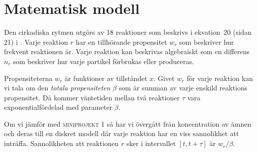 \section{Matematisk modell}
\label{sec:modell}

Den cirkadiska rytmen utgörs av 18 reaktioner som beskrivs i ekvation~20 (sidan 21) i \cite{hellander}. Varje reaktion $r$ har en tillhörande propensitet $w_r$ som beskriver hur frekvent reaktionen är. Varje reaktion kan beskrivas algebraiskt som en differens $n_r$ som beskriver hur varje partikel förbrukas eller produceras.

Propensiteterna $w_r$ är funktioner av tillståndet $x$. Givet $w_r$ för varje reaktion kan vi tala om den \emph{totala propensiteten} $\beta$ som är summan av varje enskild reaktions propensitet. Då kommer väntetiden mellan två reaktioner $\tau$ vara exponentialfördelad med parameter $\beta$.

Om vi jämför med \textsc{miniprojekt 1} så har vi övergått från koncentration av ämnen och deras  till en diskret modell där varje reaktion har en viss sannolikhet att inträffa. Sannolikheten att reaktionen $r$ sker i intervallet $[t, t + \tau]$ är $w_r/\beta$.